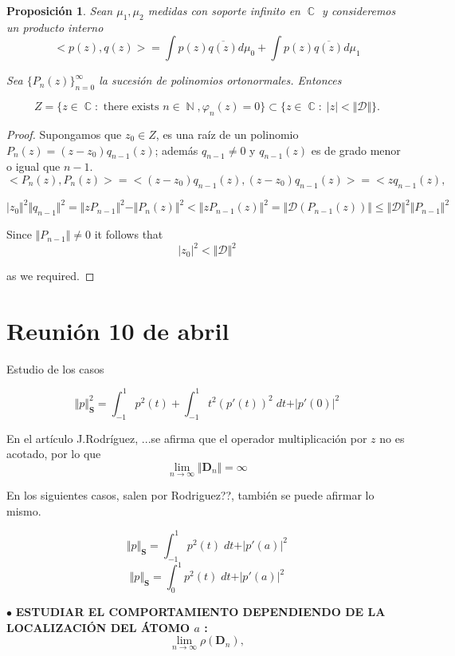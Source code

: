 \documentclass[11pt]{article}
\newtheorem{prop1}{Proposici\'{o}n}%
\newenvironment{prop}{\begin{prop1}\rm}{\end{prop1}}
\DeclareMathOperator{\CC}{\mathbb C}%
\DeclareMathOperator{\NN}{\mathbb N}%
\begin{document}
\begin{prop} Sean $\mu_1,\mu_2$ medidas con soporte infinito  en $\CC$  y consideremos un producto interno
  $$
    <p(z),q(z)>= \int p(z)\overline{q(z)} d\mu_0+ \int p(z)\overline{q(z)} d\mu_1
  $$

  \noindent Sea $\{P_n(z)\}_{n=0}^{\infty}$ la sucesión de polinomios ortonormales. Entonces


  $$
    Z=
    \{ z \in \CC: \text{ there exists } n\in \NN, \varphi_n(z)=0\}\subset \{ z\in \CC  : \;  \vert z \vert < \Vert \mathcal{D} \Vert \}.
  $$
\end{prop}

\begin{proof} Supongamos que  $z_0\in Z$, es una raíz de un polinomio $P_n(z)=(z-z_0)q_{n-1}(z)$; además   $q_{n-1} \neq 0$ y $q_{n-1}(z)$ es de grado menor o igual que $n-1$.
  $$
    <P_n(z),P_n(z)>=<(z-z_0)q_{n-1}(z),(z-z_0)q_{n-1}(z)>=<zq_{n-1}(z),
  $$



  $$
    \vert z_0 \Vert^2 \Vert q_{n-1} \Vert^2 = \Vert zP_{n-1} \Vert^2 - \Vert P_n(z) \Vert^2 < \Vert z P_{n-1}(z) \Vert^2 = \Vert \mathcal{D}(P_{n-1}(z)) \Vert \leq \Vert \mathcal{D} \Vert^2 \Vert P_{n-1} \Vert^2
  $$

  \noindent Since  $\Vert P_{n-1} \Vert \neq 0$ it follows that
  $$
    \vert z_0  \vert^2 <  \Vert \mathcal{D} \Vert^2
  $$

  \noindent as we required.
\end{proof}

\newpage
\section{Reunión 10 de abril}
\noindent Estudio de los casos

$$
  \Vert p \Vert^2_{\mathbf{S}} = \int_{-1}^{1} p^{2}(t)+ \int_{-1}^{1} t^{2} (p'(t))^{2}\; dt + \vert p'(0)\vert^{2}
$$

\noindent En el artículo J.Rodríguez, ...se afirma que el operador multiplicación por $z$ no es acotado, por lo que
$$
  \lim_{n\to \infty} \Vert \mathbf{D}_n \Vert =\infty
$$


\noindent En los siguientes casos, salen por Rodriguez??, también se puede afirmar lo mismo.

$$
  \Vert p \Vert_{\mathbf{S}} = \int_{-1}^{1} p^{2}(t)\; dt + \vert p'(a)\vert^{2}
$$
$$
  \Vert p \Vert_{\mathbf{S}} = \int_{0}^{1} p^{2}(t)\; dt + \vert p'(a)\vert^{2}
$$

\noindent $\bullet$ {\bf ESTUDIAR EL COMPORTAMIENTO DEPENDIENDO DE LA LOCALIZACIÓN DEL ÁTOMO  $a$ : }
$$
  \lim_{n\to \infty} \rho(\mathbf{D}_n),
$$
\end{document}
